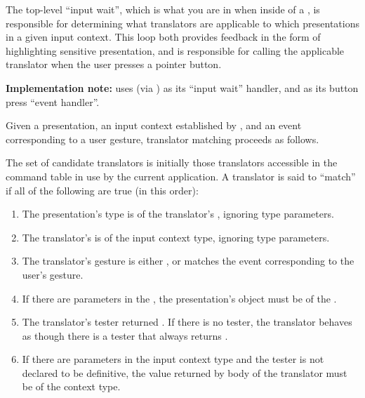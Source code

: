 The top-level ``input wait'', which is what you are in when inside of a
, is responsible for determining what translators are
applicable to which presentations in a given input context.  This loop both
provides feedback in the form of highlighting sensitive presentation, and is
responsible for calling the applicable translator when the user presses a
pointer button.

{\bf Implementation note:}  uses
 (via
) as its ``input wait'' handler, and
 as its button press ``event
handler''.

Given a presentation, an input context established by ,
and an event corresponding to a user gesture, translator matching proceeds as
follows. 

The set of candidate translators is initially those translators accessible in
the command table in use by the current application.  A translator is said to
``match'' if all of the following are true (in this order):

\begin{enumerate}
\item The presentation's type is  of the translator's
, ignoring type parameters.

\item The translator's  is  of the input
context type, ignoring type parameters.

\item The translator's gesture is either , or matches the event
corresponding to the user's gesture.

\item If there are parameters in the , the presentation's object
must be  of the .

\item The translator's tester returned .  If there is no tester, the
translator behaves as though there is a tester that always returns .

\item If there are parameters in the input context type and the tester is not
declared to be definitive, the value returned by body of the translator must be
 of the context type.
\end{enumerate}

